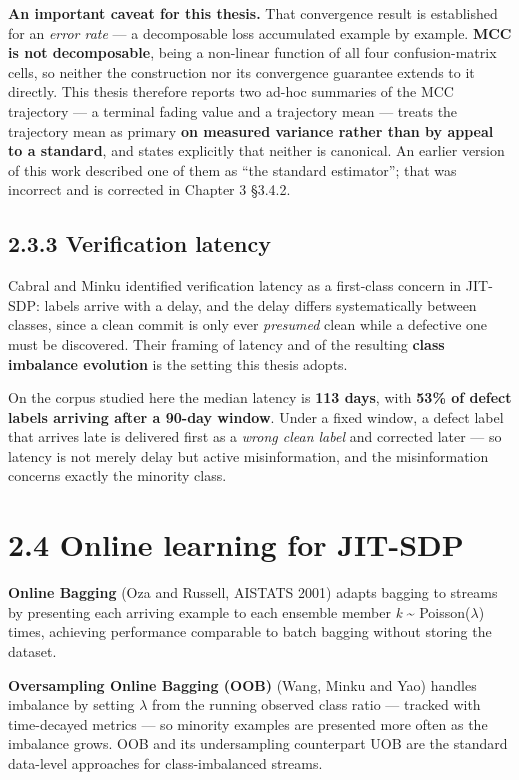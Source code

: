 \textbf{An important caveat for this thesis.} That convergence result is
established for an \emph{error rate} --- a decomposable loss accumulated
example by example. \textbf{MCC is not decomposable}, being a non-linear
function of all four confusion-matrix cells, so neither the construction
nor its convergence guarantee extends to it directly. This thesis
therefore reports two ad-hoc summaries of the MCC trajectory --- a
terminal fading value and a trajectory mean --- treats the trajectory
mean as primary \textbf{on measured variance rather than by appeal to a
standard}, and states explicitly that neither is canonical. An earlier
version of this work described one of them as ``the standard
estimator''; that was incorrect and is corrected in Chapter 3 \S{}3.4.2.

\subsection{2.3.3 Verification latency}\label{verification-latency}

Cabral and Minku identified verification latency as a first-class
concern in JIT-SDP: labels arrive with a delay, and the delay differs
systematically between classes, since a clean commit is only ever
\emph{presumed} clean while a defective one must be discovered. Their
framing of latency and of the resulting \textbf{class imbalance
evolution} is the setting this thesis adopts.

On the corpus studied here the median latency is \textbf{113 days}, with
\textbf{53\% of defect labels arriving after a 90-day window}. Under a
fixed window, a defect label that arrives late is delivered first as a
\emph{wrong clean label} and corrected later --- so latency is not
merely delay but active misinformation, and the misinformation concerns
exactly the minority class.

\section{2.4 Online learning for
JIT-SDP}\label{online-learning-for-jit-sdp}

\textbf{Online Bagging} (Oza and Russell, AISTATS 2001) adapts bagging
to streams by presenting each arriving example to each ensemble member
\emph{k} \textasciitilde{} Poisson(\ensuremath{\lambda}) times, achieving performance
comparable to batch bagging without storing the dataset.

\textbf{Oversampling Online Bagging (OOB)} (Wang, Minku and Yao) handles
imbalance by setting \ensuremath{\lambda} from the running observed class ratio --- tracked
with time-decayed metrics --- so minority examples are presented more
often as the imbalance grows. OOB and its undersampling counterpart UOB
are the standard data-level approaches for class-imbalanced streams.


